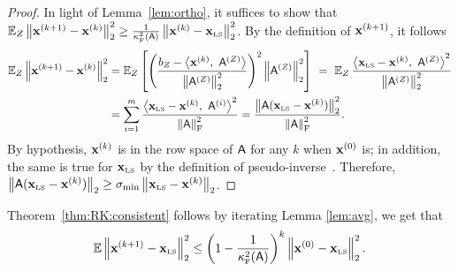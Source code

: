 %
\begin{proof}
%
In light of Lemma~\ref{lem:ortho}, it suffices to show that $\EE_{Z}\norm{\x^{(k+1)} - \x^{(k)}}^2 \geq \frac1{\kappaFS(\matA)} \norm{\x^{(k)} - \xls}^2$.
%
By the definition of $\x^{(k+1)}$, it follows
\begin{align*}
\EE_{Z}\norm{\x^{(k+1)} - \x^{(k)}}^2  &= \EE_{Z} \left[\left(\frac{b_Z - \ip{\x^{(k)}}{\ar{Z} }}{\norm{\ar{Z}}^2}\right)^2 \norm{\ar{Z}}^2\right] \ =\  \EE_{Z} \frac{\ip{\xls - \x^{(k)} }{\ar{Z}}^2}{\norm{\ar{Z}}^2} \\
 & =   \sum_{i=1}^{m} \frac{\ip{\xls - \x^{(k)}}{\ar{i}}^2}{\frobnorm{\matA}^2} = \frac{\norm{\matA (\xls - \x^{(k)})}^2}{\frobnorm{\matA}^2}.
\end{align*}
By hypothesis, $\x^{(k)}$ is in the row space of $\matA$ for any $k$ when $\x^{(0)}$ is; in addition,
the same is true for $\xls$ by the definition of pseudo-inverse~\cite{book:GVL}. Therefore,
$\norm{\matA(\xls - \x^{(k)})} \geq \sigma_{\min} \norm{\xls - \x^{(k)} }$.
\end{proof}
%
%
%
%
Theorem~\ref{thm:RK:consistent} follows by iterating Lemma \ref{lem:avg}, we get that
\[\EE \norm{\x^{(k+1)} - \xls}^2 \leq \left(1 - \frac1{\kappaFS(\matA)}\right)^k \norm{\x^{(0)} - \xls}^2.\]
%
%
